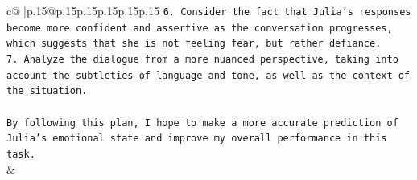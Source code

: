 \documentclass{article}
\begin{document}
{\begin{supertabular}{c@{$\;$}|p{.15\linewidth}@{}p{.15\linewidth}p{.15\linewidth}p{.15\linewidth}p{.15\linewidth}p{.15\linewidth}}
{{{\texttt{6. Consider the fact that Julia's responses become more confident and assertive as the conversation progresses, which suggests that she is not feeling fear, but rather defiance.} \\
\texttt{7. Analyze the dialogue from a more nuanced perspective, taking into account the subtleties of language and tone, as well as the context of the situation.} \\
\\ 
\texttt{By following this plan, I hope to make a more accurate prediction of Julia's emotional state and improve my overall performance in this task.} \\
            }
        }
    }
    & \\ \\

\end{supertabular}
}
\end{document}
